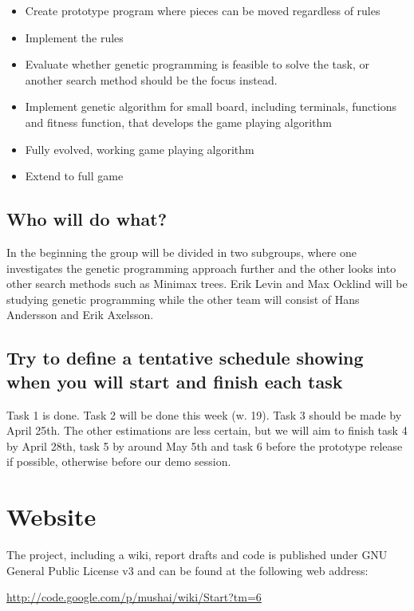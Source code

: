 \documentclass[times, 10pt,twocolumn]{article}
\begin{document}
\begin{itemize}
	\item{Create prototype program where pieces can be moved regardless of rules}
	\item{Implement the rules}
	\item{Evaluate whether genetic programming is feasible to solve the task, or another search method should be the focus instead.}
	\item{Implement genetic algorithm for small board, including terminals, functions and fitness function, that develops the game playing algorithm}
	\item{Fully evolved, working game playing algorithm}
	\item{Extend to full game}
\end{itemize}

\subsection{Who will do what?}

In the beginning the group will be divided in two subgroups, where one investigates the genetic programming approach further and the other looks into other search methods such as Minimax trees. Erik Levin and Max Ocklind will be studying genetic programming while the other team will consist of Hans Andersson and Erik Axelsson.

\subsection{Try to define a tentative schedule showing when you will start and finish each task}

Task 1 is done. Task 2 will be done this week (w. 19). Task 3 should be made by April 25th. The other estimations are less certain, but we will aim to finish task 4 by April 28th, task 5 by around May 5th and task 6 before the prototype release if possible, otherwise before our demo session.

\section{Website}
The project, including a wiki, report drafts and code is published under GNU General Public License v3 and can be found at the following web address:

\url{http://code.google.com/p/mushai/wiki/Start?tm=6}



\end{document}
